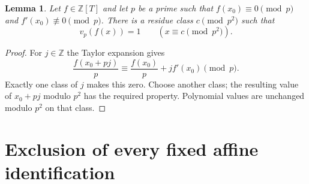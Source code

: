 \documentclass[11pt,a4paper]{article}
\newtheorem{lemma}[theorem]{Lemma}
\newcommand{\Z}{\mathbb Z}
\begin{document}
\begin{lemma}\label{lem:simplelift}
Let $f\in\Z[T]$ and let $p$ be a prime such that
$f(x_0)\equiv0\pmod p$ and $f'(x_0)\not\equiv0\pmod p$.
There is a residue class $c\pmod{p^2}$ such that
\[
                         v_p(f(x))=1
                         \qquad(x\equiv c\pmod{p^2}).
\]
\end{lemma}
\begin{proof}
For $j\in\Z$ the Taylor expansion gives
\[
 \frac{f(x_0+pj)}p
          \equiv\frac{f(x_0)}p+jf'(x_0)\pmod p.
\]
Exactly one class of $j$ makes this zero. Choose another class;
the resulting value of $x_0+pj$ modulo $p^2$ has the required
property. Polynomial values are unchanged modulo $p^2$ on that
class.
\end{proof}

\section{Exclusion of every fixed affine identification}
\end{document}
